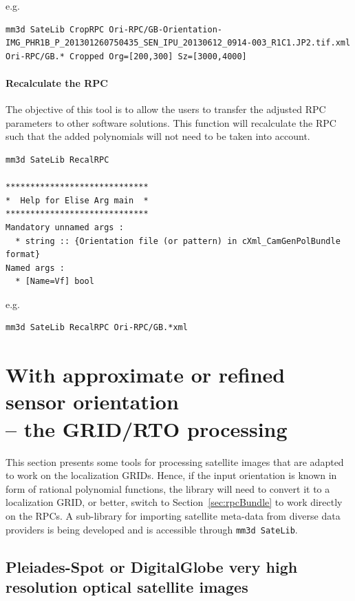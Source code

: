 e.g.
\begin{verbatim}
mm3d SateLib CropRPC Ori-RPC/GB-Orientation-IMG_PHR1B_P_201301260750435_SEN_IPU_20130612_0914-003_R1C1.JP2.tif.xml Ori-RPC/GB.* Cropped Org=[200,300] Sz=[3000,4000]
\end{verbatim}


\paragraph*{Recalculate the RPC}
The objective of this tool is to allow the users to transfer the adjusted RPC parameters to other software solutions. This function will recalculate the RPC such that the added polynomials will not need to be taken into account.

\begin{verbatim}
mm3d SateLib RecalRPC

*****************************
*  Help for Elise Arg main  *
*****************************
Mandatory unnamed args : 
  * string :: {Orientation file (or pattern) in cXml_CamGenPolBundle format}
Named args : 
  * [Name=Vf] bool

\end{verbatim}

e.g.
\begin{verbatim}
mm3d SateLib RecalRPC Ori-RPC/GB.*xml
\end{verbatim}





\section{With approximate or refined sensor orientation \\-- the GRID/RTO processing}\label{sec:gridProc}
This section presents some tools for processing satellite images that are adapted to work on the localization GRIDs. Hence, if the input orientation is known in form of rational polynomial functions, the library will need to convert it to a localization GRID, or better, switch to Section~\ref{sec:rpcBundle} to work directly on the RPCs. A sub-library for importing satellite meta-data from diverse data providers is being developed and is accessible through {\tt mm3d SateLib}.

\subsection{Pleiades-Spot or DigitalGlobe very high resolution optical satellite images}


